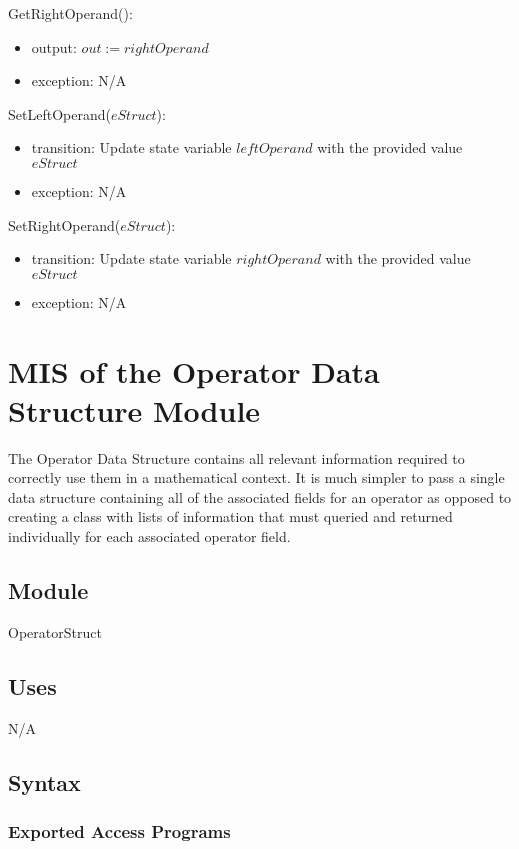 \documentclass[12pt, titlepage]{article}
\begin{document}
\noindent GetRightOperand():
\begin{itemize}
	\item output: $out := rightOperand$
	\item exception: N/A
\end{itemize}

\noindent SetLeftOperand($eStruct$):
\begin{itemize}
	\item transition: Update state variable $leftOperand$ with the provided 
	value $eStruct$
	\item exception: N/A
\end{itemize}

\noindent SetRightOperand($eStruct$):
\begin{itemize}
	\item transition: Update state variable $rightOperand$ with the provided 
	value $eStruct$
	\item exception: N/A
\end{itemize}

\newpage

\section{MIS of the Operator Data Structure Module} 
\label{Module_operatordatastructure}
The Operator Data Structure contains all relevant information required to 
correctly use them in a mathematical context. It is much simpler to pass a 
single data structure containing all of the associated fields for an operator 
as opposed to creating a class with lists of information that must queried and 
returned individually for each associated operator field.

\subsection{Module}

OperatorStruct

\subsection{Uses}

N/A

\subsection{Syntax}

\subsubsection{Exported Access Programs}
\end{document}
